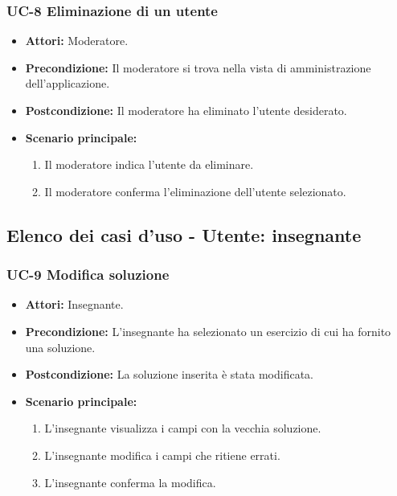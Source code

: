 \subsubsection{UC-8 Eliminazione di un utente}
\begin{itemize}
	\item \textbf{Attori:} Moderatore.
	\item \textbf{Precondizione:} Il moderatore si trova nella vista di amministrazione dell'applicazione.
	\item \textbf{Postcondizione:} Il moderatore ha eliminato l'utente desiderato.
	\item \textbf{Scenario principale:}
	\begin{enumerate}
		\item Il moderatore indica l'utente da eliminare.
		\item Il moderatore conferma l'eliminazione dell'utente selezionato.
	\end{enumerate}
\end{itemize}

\subsection{Elenco dei casi d'uso - Utente: insegnante}		
\subsubsection{UC-9 Modifica soluzione}
\begin{itemize}
\item \textbf{Attori:} Insegnante.
\item \textbf{Precondizione:} L'insegnante ha selezionato un esercizio di cui ha fornito una soluzione.
\item \textbf{Postcondizione:} La soluzione inserita è stata modificata.
\item \textbf{Scenario principale:}
		\begin{enumerate}
		\item L'insegnante visualizza i campi con la vecchia soluzione.
		\item L'insegnante modifica i campi che ritiene errati.
		\item L'insegnante conferma la modifica.
		\end{enumerate}
\end{itemize}

